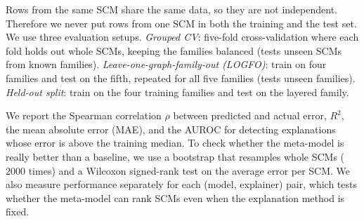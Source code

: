 Rows from the same SCM share the same data, so they are not independent. Therefore we never put rows from one SCM in both the training and the test set. We use three evaluation setups. \emph{Grouped CV}: five-fold cross-validation where each fold holds out whole SCMs, keeping the families balanced (tests unseen SCMs from known families). \emph{Leave-one-graph-family-out (LOGFO)}: train on four families and test on the fifth, repeated for all five families (tests unseen families). \emph{Held-out split}: train on the four training families and test on the layered family.

We report the Spearman correlation $\rho$ between predicted and actual error, $R^2$, the mean absolute error (MAE), and the AUROC for detecting explanations whose error is above the training median. To check whether the meta-model is really better than a baseline, we use a bootstrap that resamples whole SCMs ($2000$ times) and a Wilcoxon signed-rank test on the average error per SCM. We also measure performance separately for each (model, explainer) pair, which tests whether the meta-model can rank SCMs even when the explanation method is fixed.

